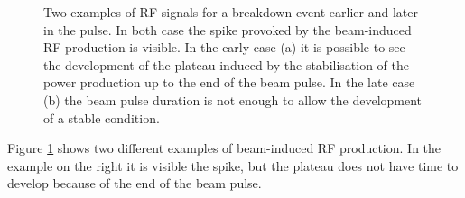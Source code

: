 \begin{figure}[h]
\centering
   \hspace{1mm}
\caption{Two examples of RF signals for a breakdown event earlier and later in the pulse. In both case the spike provoked by the beam-induced RF production is visible. In the early case (a) it is possible to see the development of the plateau induced by the stabilisation of the power production up to the end of the beam pulse. In the late case (b) the beam pulse duration is not enough to allow the development of a stable condition.}
 \label{BI_rf_fig}
 \end{figure}

Figure \ref{BI_rf_fig} shows two different examples of beam-induced RF production. In the example on the right it is visible the spike, but the plateau does not have time to develop because of the end of the beam pulse. 


